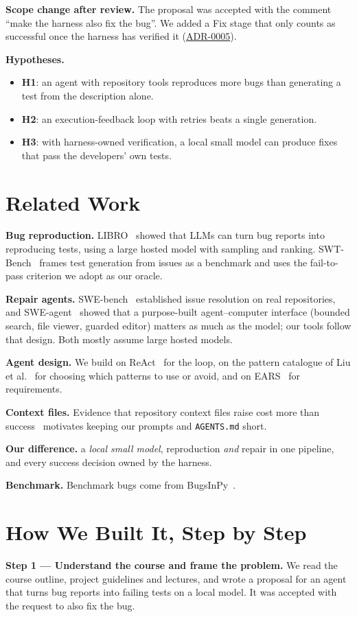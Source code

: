 \documentclass[manuscript,screen,nonacm]{acmart}
\newcommand{\repo}{https://github.com/keshavdubeyy/reproagent_autose}
\newcommand{\rlink}[2]{\href{\repo/blob/main/#1}{#2}}
\begin{document}
\textbf{Scope change after review.} The proposal was accepted with the comment ``make the harness also fix the bug''.
We added a Fix stage that only counts as successful once the harness has verified it
(\rlink{docs/adr/0005-add-fix-stage.md}{ADR-0005}).

\textbf{Hypotheses.}
\begin{itemize}
\item \textbf{H1}: an agent with repository tools reproduces more bugs than generating a test from the description alone.
\item \textbf{H2}: an execution-feedback loop with retries beats a single generation.
\item \textbf{H3}: with harness-owned verification, a local small model can produce fixes that pass the developers' own tests.
\end{itemize}

\section{Related Work}
\textbf{Bug reproduction.} LIBRO~\cite{libro} showed that LLMs can turn bug reports into reproducing tests, using a large hosted model with
sampling and ranking. SWT-Bench~\cite{swtbench} frames test generation from issues as a benchmark and uses the fail-to-pass criterion we
adopt as our oracle.

\textbf{Repair agents.} SWE-bench~\cite{swebench} established issue resolution on real repositories, and SWE-agent~\cite{sweagent}
showed that a purpose-built agent--computer interface (bounded search, file viewer, guarded editor) matters as much as the model; our tools follow
that design. Both mostly assume large hosted models.

\textbf{Agent design.} We build on ReAct~\cite{react} for the loop, on the pattern catalogue
of Liu et al.~\cite{liu-patterns} for choosing which patterns to use or avoid, and on EARS~\cite{ears} for requirements.

\textbf{Context files.} Evidence that repository context files raise cost more than success~\cite{agentsmd} motivates keeping our prompts and \texttt{AGENTS.md} short.

\textbf{Our difference.} a \emph{local small model}, reproduction \emph{and} repair in one pipeline, and every success decision owned by the harness.

\textbf{Benchmark.} Benchmark bugs come from BugsInPy~\cite{bugsinpy}.

\section{How We Built It, Step by Step}
\textbf{Step 1 --- Understand the course and frame the problem.} We read the course outline, project guidelines and lectures, and wrote a proposal
for an agent that turns bug reports into failing tests on a local model. It was accepted with the request to also fix the bug.
\end{document}

